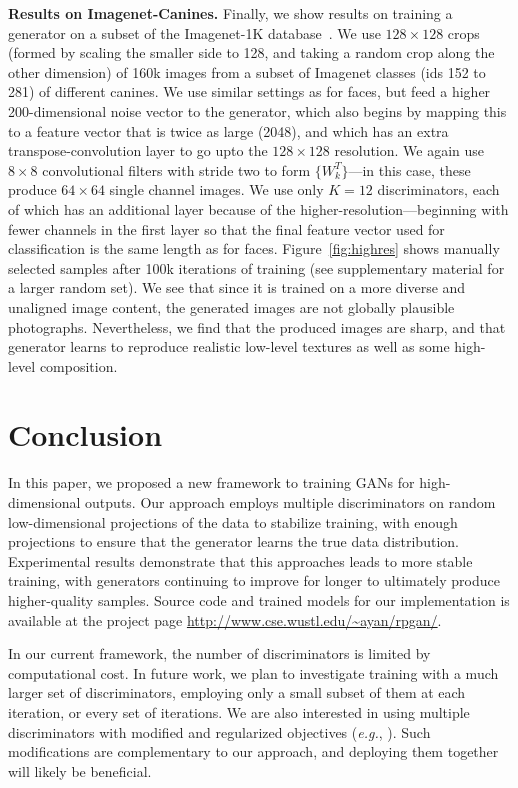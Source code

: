 \documentclass{article}
\begin{document}
\textbf{Results on Imagenet-Canines.} Finally, we show results on training a generator on a subset of the Imagenet-1K database~\citep{deng2009imagenet}. We use $128\times 128$  crops (formed by scaling the smaller side to 128, and taking a random crop along the other dimension) of 160k images from a subset of Imagenet classes (ids 152 to 281) of different canines. We use similar settings as for faces, but feed a higher 200-dimensional noise vector to the generator, which also begins by mapping this to a feature vector that is twice as large (2048), and which has an extra transpose-convolution layer to go upto the $128\times 128$ resolution. We again use $8\times 8$ convolutional filters with stride two to form $\{W_k^T\}$---in this case, these produce $64\times 64$ single channel images. We use only $K=12$ discriminators, each of which has an additional layer because of the higher-resolution---beginning with fewer channels in the first layer so that the final feature vector used for classification is the same length as for faces. Figure~\ref{fig:highres} shows manually selected samples after 100k iterations of training (see supplementary material for a larger random set). We see that since it is trained on a more diverse and unaligned image content, the generated images are not globally plausible photographs. Nevertheless, we find that the produced images are sharp, and that generator learns to reproduce realistic low-level textures as well as some high-level composition.

\section{Conclusion}
\label{sec:conc}

In this paper, we proposed a new framework to training GANs for high-dimensional outputs. Our approach employs multiple discriminators on random low-dimensional projections of the data to stabilize training, with enough projections to ensure that the generator learns the true data distribution. Experimental results demonstrate that this approaches leads to more stable training, with generators continuing to improve for longer to ultimately produce higher-quality samples. Source code and trained models for our implementation is available at the project page  \url{http://www.cse.wustl.edu/~ayan/rpgan/}.

In our current framework, the number of discriminators is limited by computational cost. In future work, we plan to investigate training with a much larger set of discriminators, employing only a small subset of them at each iteration, or every set of iterations. We are also interested in using multiple discriminators with modified and regularized objectives (\emph{e.g.}, \citep{nowozin2016f,arjovsky2017wasserstein,zhao2016energy}). Such modifications are complementary to our approach, and deploying them together will likely be beneficial.
\end{document}
